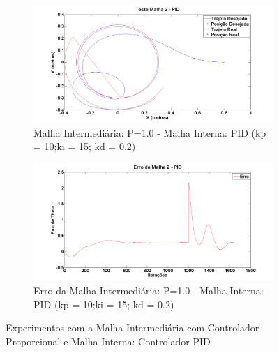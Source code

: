   \begin{figure}[!htb]
  	\centering
  	\begin{subfigure}{1.0\textwidth}
  		\centering
  		\includegraphics[width=.9\linewidth]{./Testes/Malha2/P1.0/PID/PIDPos}
  		\caption{Malha Intermediária: P=1.0 - Malha Interna: PID (kp = 10;ki = 15; kd = 0.2)}
  		\label{fig:m2pidpos}
  	\end{subfigure}
  	\begin{subfigure}{1.0\textwidth}
  		\centering
  		\includegraphics[width=.9\linewidth]{./Testes/Malha2/P1.0/PID/ErroThetaPID}
  		\caption{Erro da Malha Intermediária: P=1.0 - Malha Interna: PID (kp = 10;ki = 15; kd = 0.2)}
  		\label{fig:m2piderr}
  	\end{subfigure}
  	\caption{Experimentos com a Malha Intermediária com Controlador Proporcional e Malha Interna: Controlador PID}
  	\label{fig:m2pid}
  \end{figure}
  
